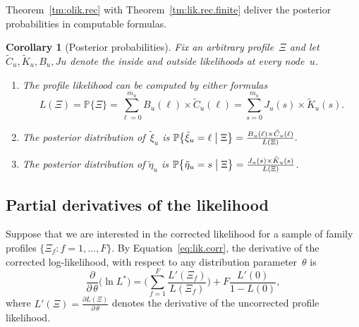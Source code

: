 \documentclass{elsarticle}
\newcommand{\condgen}[6]{{#1}#2 #5 #3 #6 #4}
\newcommand{\PROB}{\mathbb{P}}
\newcommand{\Probcsm}[2]{\condgen{\PROB}{\bigl\{}{\bigm|}{\bigr\}}{#1}{#2}}
\newtheorem{corollary}[theorem]{Corollary}
\newcommand{\nlik}{C}
\newcommand{\slik}{K}
\newcommand{\nolik}{B}
\newcommand{\solik}{J}
\newcommand{\nx}{u}
\begin{document}
Theorem~\ref{tm:olik.rec} 
with Theorem~\ref{tm:lik.rec.finite}
deliver the posterior probabilities in 
computable formulas. 
\begin{corollary}[Posterior probabilities]\label{cor:posterior}
Fix an arbitrary profile~$\Xi$ and let 
$\tilde{\nlik}_{\nx}, \tilde{\slik}_{\nx}, \nolik_{\nx}, \solik{\nx}$ 
denote the inside and outside likelihoods at every node~$\nx$. 
\begin{enumerate}[label=(\roman*)]
\item The profile likelihood can be computed 
by either formulas 
\begin{equation}\label{eq:lik.node}
L(\Xi) = \PROB\{\Xi\}
	= \sum_{\ell=0}^{m_{\nx}} \nolik_{\nx}(\ell)\times  \tilde{\nlik}_{\nx}(\ell)
 = \sum_{s=0}^{m_{\nx}} \solik_{\nx}(s)\times  \tilde{\slik}_{\nx}(s).
\end{equation}
\item The posterior distribution of~$\tilde{\xi}_{\nx}$ is 
$
\Probcsm{\tilde{\xi}_{\nx}=\ell}{\Xi} 	=\frac{\nolik_{\nx}(\ell)\times \tilde{\nlik}_{\nx}(\ell)}{L(\Xi)}.
$
\item The posterior distribution of $\tilde{\eta}_{\nx}$ is 
$
\Probcsm{\tilde{\eta}_{\nx}=s}{\Xi} = \frac{\solik_{\nx}(s)\times  \tilde{\slik}_{\nx}(s)}{L(\Xi)}
$.
\end{enumerate} 
\end{corollary}


\subsection{Partial derivatives of the likelihood}
Suppose that we are interested in the corrected likelihood 
for a sample of family profiles $\{\Xi_f\colon f=1,\dotsc, F\}$.
By Equation~\eqref{eq:lik.corr},
the derivative of the corrected log-likelihood, 
with respect to any distribution parameter~$\theta$ 
is 
\begin{equation}\label{eq:loglik.d}
\frac{\partial}{\partial\,\theta}\bigl(\ln L^*\bigr)
= \Biggl(\sum_{f=1}^F \frac{L'(\Xi_f)}{L(\Xi_f)} \Biggr)+F \frac{L'(0)}{1-L(0)},
\end{equation}
where $L'(\Xi)=\frac{\partial L(\Xi)}{\partial\, \theta}$ 
denotes the derivative of the uncorrected profile likelihood. 
\end{document}

